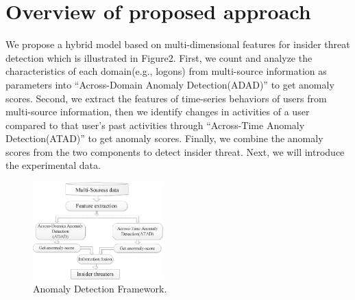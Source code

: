 \documentclass[conference]{IEEEtran}
\begin{document}
\section{Overview of proposed approach}

We propose a hybrid model based on multi-dimensional features for insider threat detection which is illustrated in Figure2. First, we count and analyze the characteristics of each domain(e.g., logons) from multi-source information as parameters into “Across-Domain Anomaly Detection(ADAD)” to get anomaly scores. Second, we extract the features of time-series behaviors of users from multi-source information, then we identify changes in activities of a user compared to that user’s past activities through “Across-Time Anomaly Detection(ATAD)” to get anomaly scores. Finally, we combine the anomaly scores from the two components to detect insider threat. Next, we will introduce the experimental data. 


\begin{figure}[htb]
\centerline{\includegraphics[width = 0.45\textwidth]{figure/figure2.eps}}
\caption{Anomaly Detection Framework.}
\label{fig}
\end{figure}
\end{document}

